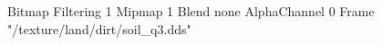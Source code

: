 {Bitmap
	{Filtering 1}
	{Mipmap 1}
	{Blend none}
	{AlphaChannel 0}
	{Frame "/texture/land/dirt/soil_q3.dds"}
}
